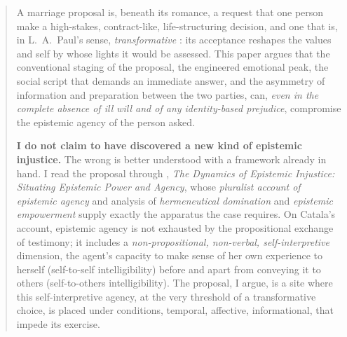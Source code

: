 
\begin{abstract}
\noindent
A marriage proposal is, beneath its romance, a request that one person make a high-stakes, contract-like, life-structuring decision, and one that is, in L.~A.\ Paul's sense, \emph{transformative} \parencite{paul2014transformative}: its acceptance reshapes the values and self by whose lights it would be assessed. This paper argues that the conventional staging of the proposal, the engineered emotional peak, the social script that demands an immediate answer, and the asymmetry of information and preparation between the two parties, can, \emph{even in the complete absence of ill will and of any identity-based prejudice}, compromise the epistemic agency of the person asked.

\smallskip
\noindent \textbf{I do not claim to have discovered a new kind of epistemic injustice.} The wrong is better understood with a framework already in hand. I read the proposal through \textcite{catala2025dynamics}, \emph{The Dynamics of Epistemic Injustice: Situating Epistemic Power and Agency}, whose \emph{pluralist account of epistemic agency} and analysis of \emph{hermeneutical domination} and \emph{epistemic empowerment} supply exactly the apparatus the case requires. On Catala's account, epistemic agency is not exhausted by the propositional exchange of testimony; it includes a \emph{non-propositional, non-verbal, self-interpretive} dimension, the agent's capacity to make sense of her own experience to herself (self-to-self intelligibility) before and apart from conveying it to others (self-to-others intelligibility). The proposal, I argue, is a site where this self-interpretive agency, at the very threshold of a transformative choice, is placed under conditions, temporal, affective, informational, that impede its exercise.


\end{abstract}
